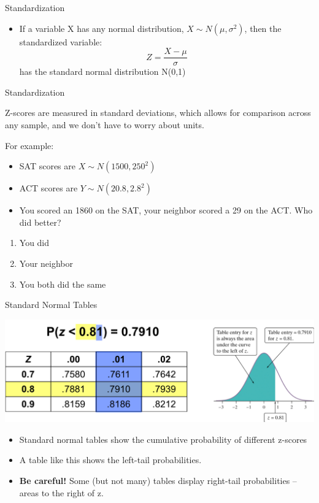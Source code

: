 \documentclass{beamer}
\begin{document}
\begin{frame}{Standardization}
    
    \begin{itemize}
        \item If a variable X has any normal distribution, $X\sim N(\mu,\sigma^2)$, then the standardized variable:
        $$Z= \frac{X-\mu}{\sigma}$$
        has the standard normal distribution N(0,1)
    \end{itemize}
	
	
\end{frame}

\begin{frame}{Standardization}
	
	Z-scores are measured in standard deviations, which allows for comparison across any sample, and we don't have to worry about units.
	
	For example:
	\begin{itemize}
		\item SAT scores are $X\sim N(1500, 250^2)$
		\item ACT scores are $Y \sim N(20.8, 2.8^2)$
		\item You scored an 1860 on the SAT, your neighbor scored a 29 on the ACT. Who did better?
	\end{itemize}
	\begin{enumerate}[label=(\alph*)]
		\item You did
		\item Your neighbor
		\item You both did the same
		      
	\end{enumerate}
\end{frame} 

\begin{frame}{Standard Normal Tables}
    
    \begin{center}
        \includegraphics[width=\textwidth]{stdnormtableex}
    \end{center}

	\begin{itemize}
        \item Standard normal tables show the cumulative probability of different z-scores
		\item A table like this shows the \alert{left-tail} probabilities. 
		
		\item \textbf{Be careful!}  Some (but not many) tables display \alert{right-tail} probabilities -- areas to the right of z.
    \end{itemize}

\end{frame}
\end{document}
